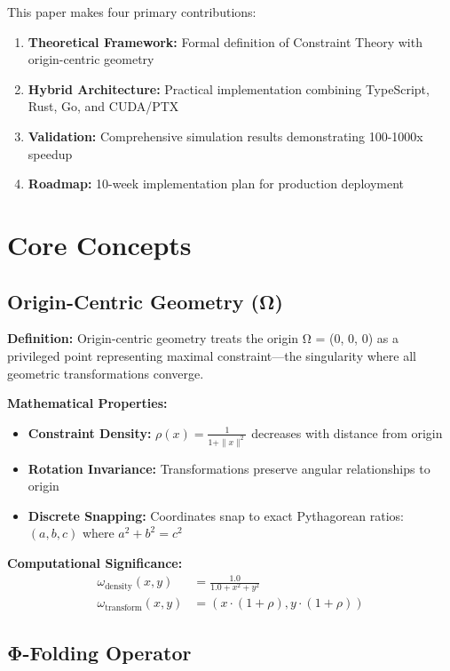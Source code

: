 \documentclass{article}
\begin{document}
This paper makes four primary contributions:

\begin{enumerate}
    \item \textbf{Theoretical Framework:} Formal definition of Constraint Theory with origin-centric geometry
    \item \textbf{Hybrid Architecture:} Practical implementation combining TypeScript, Rust, Go, and CUDA/PTX
    \item \textbf{Validation:} Comprehensive simulation results demonstrating 100-1000x speedup
    \item \textbf{Roadmap:} 10-week implementation plan for production deployment
\end{enumerate}

\section{Core Concepts}

\subsection{Origin-Centric Geometry (Ω)}

\textbf{Definition:} Origin-centric geometry treats the origin Ω = (0, 0, 0) as a privileged point representing maximal constraint—the singularity where all geometric transformations converge.

\textbf{Mathematical Properties:}
\begin{itemize}
    \item \textbf{Constraint Density:} $\rho(x) = \frac{1}{1 + \|x\|^2}$ decreases with distance from origin
    \item \textbf{Rotation Invariance:} Transformations preserve angular relationships to origin
    \item \textbf{Discrete Snapping:} Coordinates snap to exact Pythagorean ratios: $(a, b, c)$ where $a^2 + b^2 = c^2$
\end{itemize}

\textbf{Computational Significance:}
\begin{align}
\omega_{\text{density}}(x, y) &= \frac{1.0}{1.0 + x^2 + y^2} \\
\omega_{\text{transform}}(x, y) &= \left(x \cdot (1 + \rho), y \cdot (1 + \rho)\right)
\end{align}

\subsection{Φ-Folding Operator}
\end{document}

